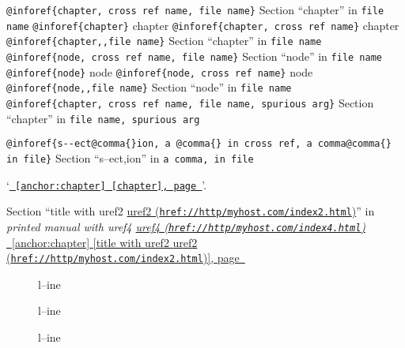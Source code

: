 \documentclass{book}
\newcommand\GNUTexinfotablestyleemph[1]{{\normalfont\emph{#1}}}%
\begin{document}
\texttt{@inforef\{chapter,\ cross ref name,\ file name\}} Section ``chapter'' in \texttt{file name}
\texttt{@inforef\{chapter\}} chapter
\texttt{@inforef\{chapter,\ cross ref name\}} chapter
\texttt{@inforef\{chapter{,}{,}file name\}} Section ``chapter'' in \texttt{file name}
\texttt{@inforef\{node,\ cross ref name,\ file name\}} Section ``node'' in \texttt{file name}
\texttt{@inforef\{node\}} node
\texttt{@inforef\{node,\ cross ref name\}} node
\texttt{@inforef\{node{,}{,}file name\}} Section ``node'' in \texttt{file name}
\texttt{@inforef\{chapter,\ cross ref name,\ file name,\ spurious arg\}} Section ``chapter'' in \texttt{file name,\ spurious arg}

\texttt{@inforef\{s{-}{-}ect@comma\{\}ion,\ a @comma\{\} in cross
ref,\ a comma@comma\{\} in file\}}
Section ``s--ect,ion'' in \texttt{a comma, in file}

`\texttt{\hyperref[anchor:chapter]{\chaptername~\ref*{anchor:chapter} [chapter], page~\pageref*{anchor:chapter}}}'.

Section ``title with uref2 \href{href://http/myhost.com/index2.html}{uref2 (\nolinkurl{href://http/myhost.com/index2.html})}'' in \textsl{printed manual with uref4 \href{href://http/myhost.com/index4.html}{uref4 (\nolinkurl{href://http/myhost.com/index4.html})}}
\hyperref[anchor:chapter]{\chaptername~\ref*{anchor:chapter} [title with uref2 \href{href://http/myhost.com/index2.html}{uref2 (\nolinkurl{href://http/myhost.com/index2.html})}], page~\pageref*{anchor:chapter}}

\begin{description}
\item[{\parbox[b]{\linewidth}{%
\textbf{a--strong}}}]
l--ine
\end{description}

\begin{description}
\item[{\parbox[b]{\linewidth}{%
a--asis\\
\index[cp]{a--asis@\texttt{a{-}{-}asis}}%
b
\index[cp]{b@\texttt{b}}%
}}]
l--ine
\end{description}

\begin{description}
\item[{\parbox[b]{\linewidth}{%
\GNUTexinfotablestyleemph{a}\\
\index[fn]{a@\texttt{a}}%
\index[cp]{index entry between item and itemx}%
\GNUTexinfotablestyleemph{b}
\index[fn]{b@\texttt{b}}%
}}]
l--ine
\end{description}
\end{document}
